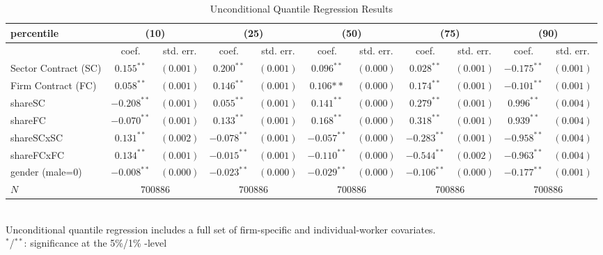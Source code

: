 \begin{landscape}
\begin{table}[]
\scriptsize
\centering
\caption{Unconditional Quantile Regression Results}
\label{UQRimplement}
\begin{tabular}{l|cccccccccc}
 percentile & \multicolumn{2}{c}{(10)} & \multicolumn{2}{c}{(25)} & \multicolumn{2}{c}{(50)} & \multicolumn{2}{c}{(75)} & \multicolumn{2}{c}{(90)}\\
\hline
 & coef. & std. err. & coef. & std. err. & coef. & std. err. & coef. & std. err. & coef. & std. err. \\
\hline
Sector Contract (SC)    & $0.155^{**}$ & $(0.001)$ & $0.200^{**}$ & $(0.001)$ & $0.096^{**}$ & $(0.000)$ & $0.028^{**}$ & $(0.001)$ & $-0.175^{**}$ & $(0.001)$\\
Firm Contract (FC)      & $0.058^{**}$ & $(0.001)$ & $0.146^{**}$ & $(0.001)$ & $0.106{**}$ & $(0.000)$ & $0.174^{**}$ & $(0.001)$ & $-0.101^{**}$ & $(0.001)$\\
shareSC                 & $-0.208^{**}$ & $(0.001)$ & $0.055^{**}$ & $(0.001)$ & $0.141^{**}$ & $(0.000)$ & $0.279^{**}$ & $(0.001)$ & $0.996^{**}$ & $(0.004)$\\
shareFC                 & $-0.070^{**}$ & $(0.001)$ & $0.133^{**}$ & $(0.001)$ & $0.168^{**}$ & $(0.000)$ & $0.318^{**}$ & $(0.001)$ & $0.939^{**}$ & $(0.004)$\\
shareSCxSC              & $0.131^{**}$ & $(0.002)$ & $-0.078^{**}$ & $(0.001)$ & $-0.057^{**}$ & $(0.000)$ & $-0.283^{**}$ & $(0.001)$ & $-0.958^{**}$ & $(0.004)$\\
shareFCxFC              & $0.134^{**}$ & $(0.001)$ & $-0.015^{**}$ & $(0.001)$ & $-0.110^{**}$ & $(0.000)$ & $-0.544^{**}$ & $(0.002)$ & $-0.963^{**}$ & $(0.004)$\\
gender (male=0)         & $-0.008^{**}$ & $(0.000)$ & $-0.023^{**}$ & $(0.000)$ & $-0.029^{**}$ & $(0.000)$ & $-0.106^{**}$ & $(0.000)$  & $-0.177^{**}$ & $(0.001)$\\
\hline
$N$                     & \multicolumn{2}{c}{700886} & \multicolumn{2}{c}{700886} & \multicolumn{2}{c}{700886} & \multicolumn{2}{c}{700886} & \multicolumn{2}{c}{700886} \\
\hline
\end{tabular}\\
\bigskip
Unconditional quantile regression includes a full set of firm-specific and individual-worker covariates.\\
$^{*}$/$^{**}$: significance at the 5\%/1\% -level
\end{table}

\end{landscape}
